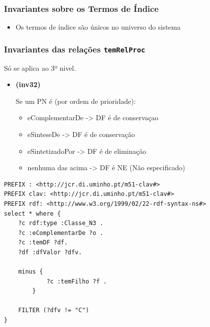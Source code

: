 \documentclass[tikz,runningheads,a4paper]{llncs}
\begin{document}
\begin{subappendices}
\hypertarget{invariantes-sobre-os-termos-de-indice}{%
\subsubsection{Invariantes sobre os Termos de
Índice}\label{invariantes-sobre-os-termos-de-uxedndice}}

\begin{itemize}
\tightlist
\item
  Os termos de índice são únicos no universo do sistema
\end{itemize}

\hypertarget{invariantes-das-relacoes-temrelproc}{%
\subsubsection{\texorpdfstring{Invariantes das relações
\texttt{temRelProc}}{Invariantes das relações temRelProc}}\label{invariantes-das-relauxe7uxf5es-temrelproc}}

Só se aplica ao 3º nivel.

\begin{itemize}
\tightlist
\item
  \hypertarget{inv32}{\textbf{(inv32)}} Se um PN é (por ordem de prioridade):

  \begin{itemize}
  \tightlist
  \item
    eComplementarDe -\textgreater{} DF é de conservaçao
  \item
    eSinteseDe -\textgreater{} DF é de conservação
  \item
    eSintetizadoPor -\textgreater{} DF é de eliminação
  \item
    nenhuma das acima -\textgreater{} DF é NE (Não especificado)
  \end{itemize}
\end{itemize}

\begin{lstlisting}[language=sparql, frame=single, basicstyle=\scriptsize]
PREFIX : <http://jcr.di.uminho.pt/m51-clav#>
PREFIX clav: <http://jcr.di.uminho.pt/m51-clav#>
PREFIX rdf: <http://www.w3.org/1999/02/22-rdf-syntax-ns#>
select * where {
    ?c rdf:type :Classe_N3 .
    ?c :eComplementarDe ?o .
    ?c :temDF ?df.
    ?df :dfValor ?dfv.
    
    minus {
            ?c :temFilho ?f .
        }

    FILTER (?dfv != "C")
}
\end{lstlisting}


\end{subappendices}
\end{document}
